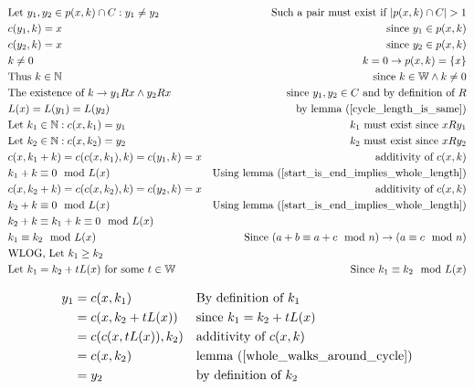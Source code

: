 \documentclass[11pt]{article}
\begin{document}
    \begin{align*}
        & \text{Let $y_{1},y_{2} \in p(x,k) \cap C: y_{1} \not = y_{2}$} & \text{Such a pair must exist if $|p(x,k) \cap C|>1$} \\
        & \text{$c(y_{1},k)=x$} & \text{since $y_{1}\in p(x,k)$} \\
        & \text{$c(y_{2},k)=x$} & \text{since $y_{2} \in p(x,k)$} \\
        & \text{$k\not = 0$} & \text{$k=0 \rightarrow p(x,k)=\{x\}$} \\
        & \text{Thus $k \in \mathbb{N}$} & \text{since $k \in \mathbb{W} \land k\not = 0$} \\
        & \text{The existence of $k \rightarrow y_{1}Rx \land y_{2}Rx$} & \text{since $y_{1},y_{2} \in C$ and by definition of $R$} \\
        & \text{$L(x)=L(y_{1})=L(y_{2})$} & \text{by lemma (\ref{cycle_length_is_same})} \\
        & \text{Let $k_{1} \in \mathbb{N}: c(x,k_{1})=y_{1}$} & \text{$k_{1}$ must exist since $xRy_{1}$} \\
        & \text{Let $k_{2} \in \mathbb{N}: c(x,k_{2})=y_{2}$} & \text{$k_{2}$ must exist since $xRy_{2}$} \\
        & \text{$c(x,k_{1}+k) = c(c(x,k_{1}),k) = c(y_{1},k) = x$} & \text{additivity of $c(x,k)$} \\
        & \text{$k_{1}+k \equiv 0 \mod L(x)$} & \text{Using lemma (\ref{start_is_end_implies_whole_length})} \\
        & \text{$c(x,k_{2}+k) = c(c(x,k_{2}),k) = c(y_{2},k) = x$} & \text{additivity of $c(x,k)$} \\
        & \text{$k_{2}+k \equiv 0 \mod L(x)$} & \text{Using lemma (\ref{start_is_end_implies_whole_length})} \\
        & \text{$k_{2}+k \equiv k_{1}+k \equiv 0 \mod L(x)$} & \text{} \\
        & \text{$k_{1} \equiv k_{2} \mod L(x)$} & \text{Since $(a+b\equiv a+c \mod n) \rightarrow (a\equiv c \mod n)$} \\
        & \text{WLOG, Let $k_{1}\geq k_{2}$} & \text{} \\
        & \text{Let $k_{1} = k_{2} + tL(x)$ for some $t \in \mathbb{W} $} & \text{Since $k_{1} \equiv k_{2} \mod L(x)$}
    \end{align*}

    \begin{align*}
        \text{$y_{1}$} &= \text{$c(x,k_{1})$} && \text{By definition of $k_{1}$} \\
        &= \text{$c(x,k_{2}+tL(x))$} && \text{since $k_{1} = k_{2}+tL(x)$} \\
        &= \text{$c(c(x,tL(x)),k_{2})$} && \text{additivity of $c(x,k)$} \\
        &= \text{$c(x,k_{2})$} && \text{lemma (\ref{whole_walks_around_cycle})} \\
        &= \text{$y_{2}$} && \text{by definition of $k_{2}$}
    \end{align*}
\end{document}
